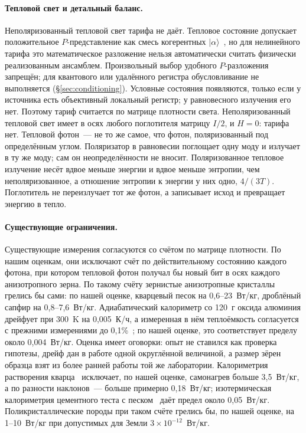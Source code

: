 \documentclass[11pt,a4paper]{article}
\newcommand{\Sref}[1]{\hyperref[#1]{\S\ref{#1}}}
\begin{document}
\paragraph{Тепловой свет и детальный баланс.}
Неполяризованный тепловой свет тарифа не даёт. Тепловое состояние допускает положительное $P$-представление как смесь когерентных $|\alpha\rangle$~\cite{glauber1963}, но для нелинейного тарифа это математическое разложение нельзя автоматически считать физически реализованным ансамблем. Произвольный выбор удобного $P$-разложения запрещён; для квантового или удалённого регистра обусловливание не выполняется (\Sref{sec:conditioning}). Условные состояния появляются, только если у источника есть объективный локальный регистр; у равновесного излучения его нет. Поэтому тариф считается по матрице плотности света. Неполяризованный тепловой свет имеет в осях любого поглотителя матрицу $I/2$, и $H=0$: тарифа нет. Тепловой фотон~--- не то же самое, что фотон, поляризованный под определённым углом. Поляризатор в равновесии поглощает одну моду и излучает в ту же моду; сам он неопределённости не вносит. Поляризованное тепловое излучение несёт вдвое меньше энергии и вдвое меньше энтропии, чем неполяризованное, а отношение энтропии к энергии у них одно, $4/(3T)$. Поглотитель не переизлучает тот же фотон, а записывает исход и превращает энергию в тепло.

\paragraph{Существующие ограничения.}
Существующие измерения согласуются со счётом по матрице плотности. По нашим оценкам, они исключают счёт по действительному состоянию каждого фотона, при котором тепловой фотон получал бы новый бит в осях каждого анизотропного зерна. По такому счёту зернистые анизотропные кристаллы грелись бы сами: по нашей оценке, кварцевый песок на 0,6--23~Вт/кг, дроблёный сапфир на 0,8--7,6~Вт/кг. Адиабатический калориметр со 120~г оксида алюминия дрейфует при 300~K на 0,005~К/ч, а измеренная в нём теплоёмкость согласуется с прежними измерениями до 0,1\%~\cite{west1958}; по нашей оценке, это соответствует пределу около 0,004~Вт/кг. Оценка имеет оговорки: опыт не ставился как проверка гипотезы, дрейф дан в работе одной округлённой величиной, а размер зёрен образца взят из более ранней работы той же лаборатории. Калориметрия растворения кварца~\cite{kilday1973} исключает, по нашей оценке, самонагрев больше 3,5~Вт/кг, а по разности наклонов~--- больше примерно 0,18~Вт/кг; изотермическая калориметрия цементного теста с песком~\cite{wadso2001} даёт предел около 0,05~Вт/кг. Поликристаллические породы при таком счёте грелись бы, по нашей оценке, на 1--10~Вт/кг при допустимых для Земли $3\times10^{-12}$~Вт/кг.
\end{document}
